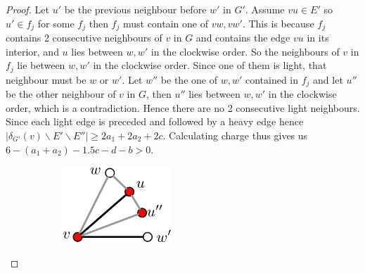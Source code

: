 \documentclass{article}
\newcommand{\0}{\mathbb{0}}
\newcommand{\1}{\mathbb{1}}
\begin{document}
\begin{proof}
Let $ u' $ be the previous neighbour before $w'$ in $G'$. %
Assume $vu \in  E'$ so $u' \in f_j$ for some $f_j$ then $f_j$ must contain one of $vw, vw'$. This is because  $f_j$ contains 2 consecutive neighbours of $v$ in $G$ and contains the edge $vu$ in its interior, and $u$ lies between $w,w'$ in the clockwise order. So the neighbours of $v$ in $f_j$ lie between $w,w'$ in the clockwise order. Since one of them is light, that neighbour must be $w$ or $w'$.  Let  $w''$ be the  one of $w,w'$ contained in $f_j$ and let $u''$ be the other neighbour of $v$ in $G$, then $u''$ lies between $w,w'$ in the clockwise order, which is a contradiction.  %
Hence there are no 2 consecutive light neighbours.  
Since each light edge is preceded and followed by a heavy edge hence $ |\delta_{G'}(v) \backslash E' \backslash E'' | \geq  2a_1 +2a_2+2c$. Calculating charge thus gives us $ 6-(a_1+a_2) -1.5c -d -b > 0 $.
\begin{figure}[h]
\begin{center}
 \begin{subfigure}[t]{0.45\textwidth}
 \includegraphics[width=0.45\textwidth]{b-face.pdf}     \label{bface}
\end{subfigure} %

\end{center}
\end{figure}
\end{proof}
\end{document}
